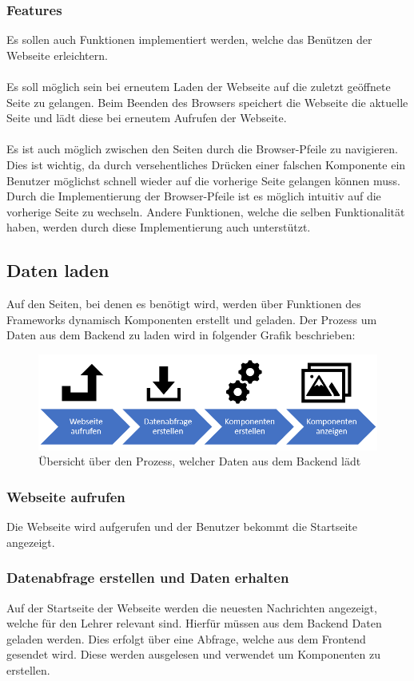 \subsubsection{Features}
\label{sec:feature}
Es sollen auch Funktionen implementiert werden, welche das Benützen der Webseite erleichtern.
\\\\
Es soll möglich sein bei erneutem Laden der Webseite auf die zuletzt geöffnete Seite zu gelangen. Beim Beenden des Browsers speichert die Webseite die aktuelle Seite und lädt diese bei erneutem Aufrufen der Webseite.
\\\\
Es ist auch möglich zwischen den Seiten durch die Browser-Pfeile zu navigieren. Dies ist wichtig, da durch versehentliches Drücken einer falschen Komponente ein Benutzer möglichst schnell wieder auf die vorherige Seite gelangen können muss. Durch die Implementierung der Browser-Pfeile ist es möglich intuitiv auf die vorherige Seite zu wechseln. Andere Funktionen, welche die selben Funktionalität haben, werden durch diese Implementierung auch unterstützt.
\newpage
\subsection{Daten laden}
Auf den Seiten, bei denen es benötigt wird, werden über Funktionen des Frameworks dynamisch Komponenten erstellt und geladen. Der Prozess um Daten aus dem Backend zu laden wird in folgender Grafik beschrieben:
\begin{figure}[H]
	\centering
	\includegraphics[width=0.8\linewidth]{images/Prozess_Daten_laden}
	\caption[Prozess der Daten zur Anzeige]{Übersicht über den Prozess, welcher Daten aus dem Backend lädt}
	\label{fig:prozessdatenladen}
\end{figure}

\subsubsection{Webseite aufrufen}
Die Webseite wird aufgerufen und der Benutzer bekommt die Startseite angezeigt.

\subsubsection{Datenabfrage erstellen und Daten erhalten}
Auf der Startseite der Webseite werden die neuesten Nachrichten angezeigt, welche für den Lehrer relevant sind. Hierfür müssen aus dem Backend Daten geladen werden. Dies erfolgt über eine Abfrage, welche aus dem Frontend gesendet wird. Diese werden ausgelesen und verwendet um Komponenten zu erstellen.

